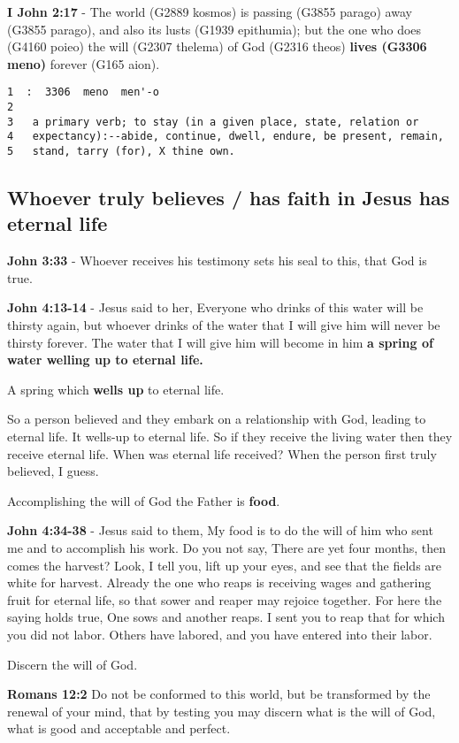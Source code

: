 \documentclass[11pt]{article}
\begin{document}
\textbf{I John 2:17} - The world (G2889 kosmos) is passing (G3855 parago) away (G3855 parago), and also its lusts (G1939 epithumia); but the one who does (G4160 poieo) the will (G2307 thelema) of God (G2316 theos) \textbf{lives (G3306 meno)} forever (G165 aion).

\begin{verbatim}
1  :  3306  meno  men'-o
2  
3   a primary verb; to stay (in a given place, state, relation or
4   expectancy):--abide, continue, dwell, endure, be present, remain,
5   stand, tarry (for), X thine own.
\end{verbatim}

\subsection{Whoever truly believes / has faith in Jesus has eternal life}
\label{sec:orgc1d9897}
\textbf{John 3:33} - Whoever receives his testimony sets his seal to this, that God is true.

\textbf{John 4:13-14} - Jesus said to her, Everyone who drinks of this water will be thirsty again, but whoever drinks of the water that I will give him will never be thirsty forever. The water that I will give him will become in him \textbf{a spring of water welling up to eternal life.}

A spring which \textbf{wells up} to eternal life.

So a person believed and they embark on a relationship with God, leading to eternal life.
It wells-up to eternal life. So if they receive the living water then they receive eternal life.
When was eternal life received? When the person first truly believed, I guess.

Accomplishing the will of God the Father is \textbf{food}.

\textbf{John 4:34-38} - Jesus said to them, My food is to do the will of him who sent me and to accomplish his work. Do you not say, There are yet four months, then comes the harvest? Look, I tell you, lift up your eyes, and see that the fields are white for harvest. Already the one who reaps is receiving wages and gathering fruit for eternal life, so that sower and reaper may rejoice together. For here the saying holds true, One sows and another reaps. I sent you to reap that for which you did not labor. Others have labored, and you have entered into their labor.

Discern the will of God.

\textbf{Romans 12:2} Do not be conformed to this world, but be transformed by the renewal of your mind, that by testing you may discern what is the will of God, what is good and acceptable and perfect.
\end{document}
